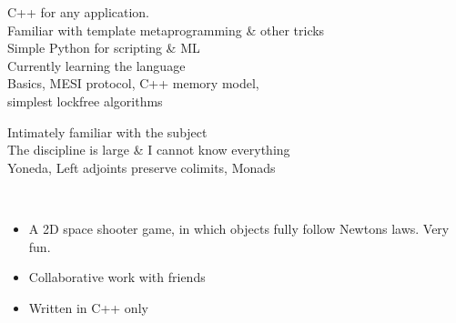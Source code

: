 \documentclass[10pt,a4paper,ragged2e,withhyper]{altacv}
\begin{document}
\begin{paracol}{2}

\smallskip
{}
\quad C++ for any application. \\
\quad Familiar with template metaprogramming \& other tricks \\
\smallskip
{}
\quad Simple Python for scripting \& ML\\
\smallskip
{}
\quad Currently learning the language\\
\smallskip
{}
\quad Basics, MESI protocol, C++ memory model,\\ 
\quad simplest lockfree algorithms\\
\smallskip



\medskip


\quad Intimately familiar with the subject \\
\smallskip
{}
\smallskip
{}
\quad The discipline is large \& I cannot know everything\\
\smallskip
{}
\smallskip
{}
\quad Yoneda, Left adjoints preserve colimits, Monads
\medskip

\\








\begin{itemize}
\item A 2D space shooter game, in which objects fully follow Newtons laws. Very fun.
\item Collaborative work with friends
\item Written in C++ only
\end{itemize}

\divider


\end{paracol}
\end{document}
